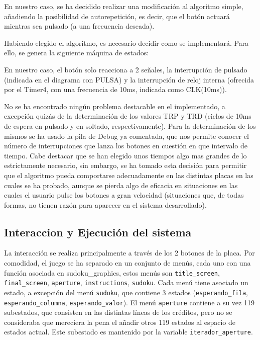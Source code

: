 \documentclass[12pt,letterpaper]{article}
\begin{document}
En nuestro caso, se ha decidido realizar una modificación al algoritmo
simple, añadiendo la posibilidad de autorepetición, es decir, que el
botón actuará mientras sea pulsado (a una frecuencia deseada).


Habiendo elegido el algoritmo, es necesario decidir como se
implementará. Para ello, se genera la siguiente máquina de estados:

En nuestro caso, el botón solo reacciona a 2 señales, la interrupción
de pulsado (indicada en el diagrama con PULSA) y la interrupción de
reloj interna (ofrecida por el Timer4, con una frecuencia de 10ms,
indicada como CLK(10ms)).

No se ha encontrado ningún problema destacable en el implementado, a
excepción quizás de la determinación de los valores TRP y TRD (ciclos
de 10ms de espera en pulsado y en soltado, respectivamente). Para la
determinación de los mismos se ha usado la pila de Debug ya comentada,
que nos permite conocer el número de interrupciones que lanza los
botones en cuestión en que intervalo de tiempo. Cabe destacar que se
han elegido unos tiempos algo mas grandes de lo estrictamente
necesario, sin embargo, se ha tomado esta decisión para permitir que
el algoritmo pueda comportarse adecuadamente en las distintas placas
en las cuales se ha probado, aunque se pierda algo de eficacia en
situaciones en las cuales el usuario pulse los botones a gran
velocidad (situaciones que, de todas formas, no tienen razón para
aparecer en el sistema desarrollado).

\subsection{Interaccion y Ejecución del sistema}
\label{subsec:interaction-ejecucion}
La interacción se realiza principalmente a través de los 2 botones de
la placa. 
Por comodidad, el juego se ha separado en un conjunto de menús, cada
uno con una función asociada en sudoku\_graphics, estos menús son
\texttt{title\_screen}, \texttt{final\_screen}, \texttt{aperture},
\texttt{instructions}, \texttt{sudoku}. Cada menú tiene asociado un
estado, a excepción del menú \texttt{sudoku}, que contiene 3 estados
(\texttt{esperando\_fila}, \texttt{esperando\_columna},
\texttt{esperando\_valor}). El menú \texttt{aperture} contiene a su
vez 119 subestados, que consisten en las distintas líneas de los
créditos, pero no se consideraba que mereciera la pena el añadir otros
119 estados al espacio de estados actual. Este subestado es mantenido
por la variable \texttt{iterador\_aperture}. 
\end{document}
